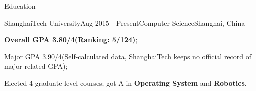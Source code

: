 \documentclass{resume} %
\begin{document}

\begin{rSection}{Education}

\begin{rSubsection}
  {ShanghaiTech University}{Aug 2015 - Present}{Computer Science}{Shanghai, China}
    \item \textbf{Overall GPA 3.80/4(Ranking: 5/124)};
    \item Major GPA 3.90/4(Self-calculated data, ShanghaiTech keeps no official record of major related GPA);
    \item Elected 4 graduate level courses; got A in \textbf{Operating System} and \textbf{Robotics}.
\end{rSubsection}

\end{rSection}
\end{document}
